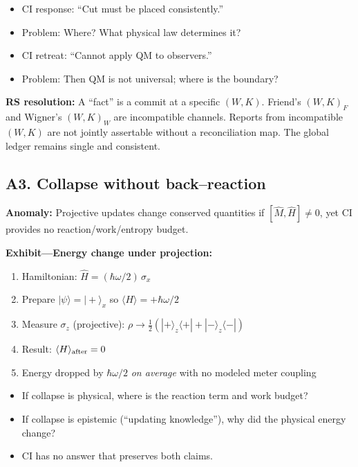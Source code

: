 \documentclass[11pt]{article}
\begin{document}
\begin{itemize}[nosep]
  \item CI response: ``Cut must be placed consistently.''
  \item Problem: Where? What physical law determines it?
  \item CI retreat: ``Cannot apply QM to observers.''
  \item Problem: Then QM is not universal; where is the boundary?
\end{itemize}

\textbf{RS resolution:} A ``fact'' is a commit at a specific $(W,K)$. Friend's $(W,K)_F$ and Wigner's $(W,K)_W$ are incompatible channels. Reports from incompatible $(W,K)$ are not jointly assertable without a reconciliation map. The global ledger remains single and consistent.

\subsection{A3. Collapse without back--reaction}

\begin{alertbox}
\textbf{Anomaly:} Projective updates change conserved quantities if $[\hat M, \hat H]\ne 0$, yet CI provides no reaction/work/entropy budget.
\end{alertbox}

\textbf{Exhibit---Energy change under projection:}
\begin{enumerate}[nosep]
  \item Hamiltonian: $\hat H=(\hbar\omega/2)\,\sigma_x$
  \item Prepare $|\psi\rangle=|+\rangle_x$ so $\langle H\rangle=+\hbar\omega/2$
  \item Measure $\sigma_z$ (projective): $\rho\to \tfrac12(|+\rangle_z\!\langle+| + |-\rangle_z\!\langle-|)$
  \item Result: $\langle H\rangle_{\rm after}=0$
  \item Energy dropped by $\hbar\omega/2$ \emph{on average} with no modeled meter coupling
\end{enumerate}

\begin{itemize}[nosep]
  \item If collapse is physical, where is the reaction term and work budget?
  \item If collapse is epistemic (``updating knowledge''), why did the physical energy change?
  \item CI has no answer that preserves both claims.
\end{itemize}
\end{document}
